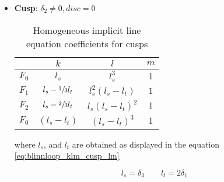 \documentclass[\topdir/main.tex]{subfiles}
\begin{document}
\begin{itemize}
     
    \item \textbf{Cusp}: $\delta_2 \neq 0, disc = 0$
        \begin{table}[H]
            \centering
            \begin{tabular}{|l|c|c|c|}
                \hline
                \qquad&     $k$ &               $l$ &               $m$             \\\hline
                $F_0$ &     $l_s$ &             $l_s^3$ &           $1$             \\\hline
                $F_1$ &     $l_s - \sfrac{1}{3} l_t$ &    
                            $l_s^2 (l_s - l_t)$ &               
                            $1$ \\\hline
                $F_2$ &     $l_s - \sfrac{2}{3} l_t$ &    
                            $l_s (l_s - l_t)^2$ &               
                            $1$ \\\hline
                $F_0$ &     $(l_s - l_t)$ &     $(l_s - l_t)^3$ &   $1$             \\\hline
            \end{tabular}
            \caption{Homogeneous implicit line equation coefficients for cusps}
            \label{tab:blinnloop_klm_cusp}
        \end{table}
        
        where $l_s$, and $l_t$  are obtained as displayed in the equation \eqref{eq:blinnloop_klm_cusp_lm}
    
        \begin{equation} \label{eq:blinnloop_klm_cusp_lm}
            l_s = \delta_3\qquad
            l_t = 2 \delta_1
        \end{equation}
    

\end{itemize}
\end{document}
